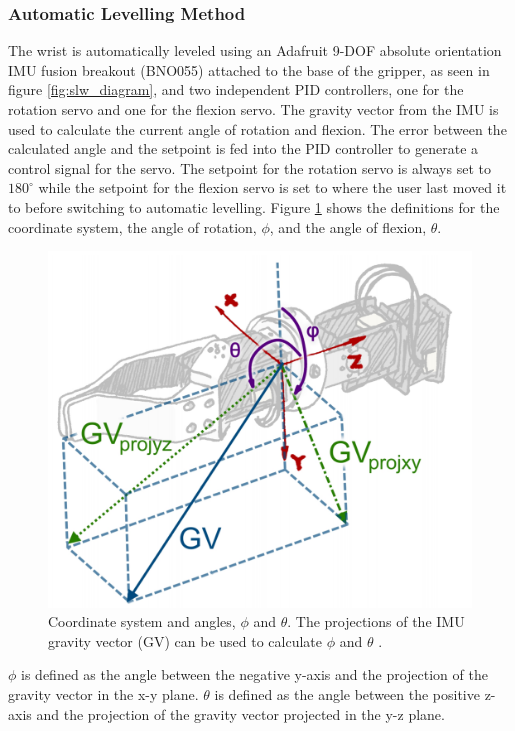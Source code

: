 \documentclass[letterpaper,12pt]{article}
\newcommand{\degrees}{^\circ}
\begin{document}
\subsubsection{Automatic Levelling Method}
The wrist is automatically leveled using an Adafruit 9-DOF absolute orientation IMU fusion breakout (BNO055) attached to the base of the gripper, as seen in figure \ref{fig:slw_diagram}, and two independent PID controllers, one for the rotation servo and one for the flexion servo. The gravity vector from the IMU is used to calculate the current angle of rotation and flexion. The error between the calculated angle and the setpoint is fed into the PID controller to generate a control signal for the servo. The setpoint for the rotation servo is always set to $180\degrees$ while the setpoint for the flexion servo is set to where the user last moved it to before switching to automatic levelling. Figure \ref{fig:angles} shows the definitions for the coordinate system, the angle of rotation, $\phi$, and the angle of flexion, $\theta$.

\begin{figure}[H]
\centering \includegraphics[width=0.8\columnwidth]{angles.png}
\caption{\label{fig:angles}Coordinate system and angles, $\phi$ and $\theta$. The projections of the IMU gravity vector (GV) can be used to calculate $\phi$ and $\theta$ \cite{d.j.a.brenneis}.}
\end{figure}

$\phi$ is defined as the angle between the negative y-axis and the projection of the gravity vector in the x-y plane. $\theta$ is defined as the angle between the positive z-axis and the projection of the gravity vector projected in the y-z plane.
\end{document}
